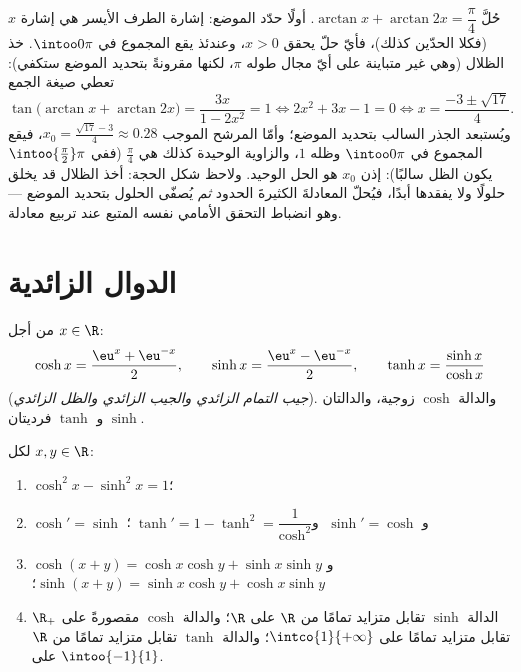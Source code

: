 \begin{example}\label{ex:b1:functions:arctaneq}
حُلَّ $\arctan x + \arctan 2x = \dfrac\pi4$. أولًا حدّد الموضع: إشارة
الطرف الأيسر هي إشارة $x$ (فكلا الحدّين كذلك)، فأيّ حلّ يحقق
$x > 0$، وعندئذ يقع المجموع في $\intoo0\pi$. خذ الظلال
(وهي غير متباينة على أيّ مجال طوله $\pi$، لكنها مقرونةً
بتحديد الموضع ستكفي): تعطي صيغة الجمع
\[
\tan\bigl(\arctan x + \arctan 2x\bigr)
= \frac{3x}{1 - 2x^2} = 1
\iff 2x^2 + 3x - 1 = 0
\iff x = \frac{-3 \pm \sqrt{17}}4 .
\]
ويُستبعد الجذر السالب بتحديد الموضع؛ وأمّا المرشح
الموجب $x_0 = \frac{\sqrt{17} - 3}4 \approx 0.28$،
فيقع المجموع في $\intoo0\pi$ وظله $1$، والزاوية الوحيدة
كذلك هي $\frac\pi4$ (ففي $\intoo{\frac\pi2}\pi$ يكون الظل
سالبًا): إذن $x_0$ هو الحل الوحيد. ولاحظ شكل
الحجة: أخذ الظلال قد يخلق حلولًا ولا يفقدها أبدًا،
فيُحلّ المعادلةَ الكثيرةَ الحدود \emph{ثم} يُصفّى الحلول
بتحديد الموضع --- وهو انضباط التحقق الأمامي نفسه المتبع عند
تربيع معادلة.
\end{example}

\section{الدوال الزائدية}

\begin{definition}\label{def:b1:functions:hyperbolic}
من أجل $x \in \R$:
\[
\cosh x = \frac{\eu^x + \eu^{-x}}{2},
\qquad
\sinh x = \frac{\eu^x - \eu^{-x}}{2},
\qquad
\tanh x = \frac{\sinh x}{\cosh x}
\]
(\emph{جيب التمام الزائدي والجيب الزائدي والظل الزائدي}). والدالة $\cosh$ زوجية، والدالتان $\sinh$ و $\tanh$
فرديتان.
\end{definition}

\begin{proposition}\label{prop:b1:functions:hyprules}
لكل $x, y \in \R$:
\begin{enumerate}
  \item $\cosh^2 x - \sinh^2 x = 1$؛
  \item $\cosh' = \sinh$ و $\;\sinh' = \cosh$ و$\;\tanh' = 1 - \tanh^2
        = \dfrac{1}{\cosh^2}$؛
  \item $\cosh(x+y) = \cosh x\cosh y + \sinh x \sinh y$ و
        $\sinh(x+y) = \sinh x \cosh y + \cosh x \sinh y$؛
  \item الدالة $\sinh$ تقابل متزايد تمامًا من $\R$ على $\R$؛
        والدالة $\cosh$ مقصورةً على $\R_+$ تقابل متزايد تمامًا
        على $\intco{1}{+\infty}$؛ والدالة $\tanh$ تقابل متزايد
        تمامًا من $\R$ على $\intoo{-1}{1}$.
\end{enumerate}
\end{proposition}

